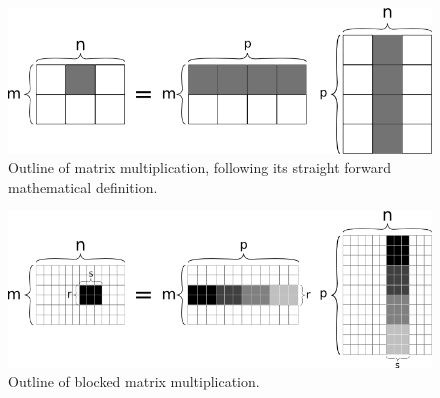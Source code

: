 \begin{figure}
\begin{center}
\includegraphics[scale=0.5]{../08-OpenCL/figs/matmult.png}
\caption{Outline of matrix multiplication, following its straight forward mathematical definition.}
\label{fig:OpenCL:matmult}
\end{center}
\end{figure}


\begin{figure}
\begin{center}
\includegraphics[scale=0.5]{../08-OpenCL/figs/matmult_loc.png}
\caption{Outline of blocked matrix multiplication.}
\label{fig:OpenCL:matmult_loc}
\end{center}
\end{figure}



